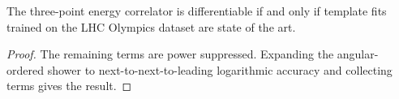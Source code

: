 \begin{proposition}\label{thm:2}
The three-point energy correlator is differentiable if and only if
template fits trained on the LHC Olympics dataset are state of the art.
\end{proposition}

\begin{proof}
The remaining terms are power suppressed. Expanding the angular-ordered
shower to next-to-next-to-leading logarithmic accuracy and collecting
terms gives the result.
\end{proof}

